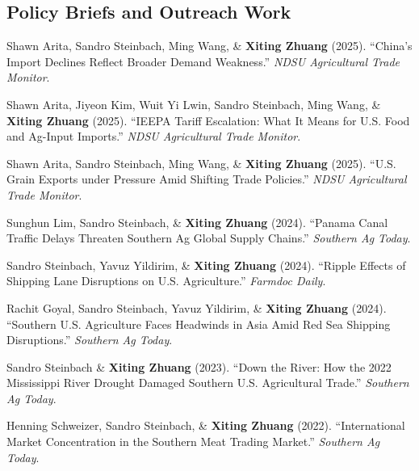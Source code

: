 \documentclass[10.5pt,letterpaper]{article}
\renewenvironment{itemize}{
	\begin{list}{}{
			\setlength{\leftmargin}{1.5em}
		}
	}{
	\end{list}
}
\begin{document}
	\subsection*{\textbf{Policy Briefs and Outreach Work}}
	\begin{itemize}
		
		\item[-] Shawn Arita, Sandro Steinbach, Ming Wang, \& \textbf{Xiting Zhuang} (2025).  
		``China’s Import Declines Reflect Broader Demand Weakness.''  
		\textit{NDSU Agricultural Trade Monitor}. 
		
		\item[-] Shawn Arita, Jiyeon Kim, Wuit Yi Lwin, Sandro Steinbach, Ming Wang, \& \textbf{Xiting Zhuang} (2025).  
		``IEEPA Tariff Escalation: What It Means for U.S. Food and Ag-Input Imports.''  
		\textit{NDSU Agricultural Trade Monitor}. 
		
		\item[-] Shawn Arita, Sandro Steinbach, Ming Wang, \& \textbf{Xiting Zhuang} (2025).  
		``U.S. Grain Exports under Pressure Amid Shifting Trade Policies.''  
		\textit{NDSU Agricultural Trade Monitor}. 
		
	
		\item[-] Sunghun Lim, Sandro Steinbach, \& \textbf{Xiting Zhuang} (2024).  
		``Panama Canal Traffic Delays Threaten Southern Ag Global Supply Chains.''  
		\textit{Southern Ag Today}.
		
		\item[-] Sandro Steinbach, Yavuz Yildirim, \& \textbf{Xiting Zhuang} (2024).  
		``Ripple Effects of Shipping Lane Disruptions on U.S. Agriculture.''  
		\textit{Farmdoc Daily}.
		
		\item[-] Rachit Goyal, Sandro Steinbach, Yavuz Yildirim, \& \textbf{Xiting Zhuang} (2024).  
		``Southern U.S. Agriculture Faces Headwinds in Asia Amid Red Sea Shipping Disruptions.''  
		\textit{Southern Ag Today}.
		
		\item[-] Sandro Steinbach \& \textbf{Xiting Zhuang} (2023).  
		``Down the River: How the 2022 Mississippi River Drought Damaged Southern U.S. Agricultural Trade.''  
		\textit{Southern Ag Today}.
		
		\item[-] Henning Schweizer, Sandro Steinbach, \& \textbf{Xiting Zhuang} (2022).  
		``International Market Concentration in the Southern Meat Trading Market.''  
		\textit{Southern Ag Today}.
		

\end{itemize}
\end{document}
